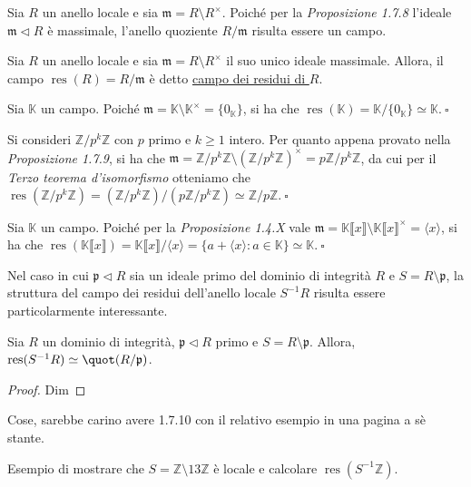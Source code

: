 \noindent Sia $R$ un anello locale e sia $\mathfrak{m}=R\setminus R^{\times}$. Poiché per la \emph{Proposizione 1.7.8} l'ideale $\mathfrak{m}\lhd R$ è massimale, l'anello quoziente $R/\mathfrak{m}$ risulta essere un campo.

\begin{defn}[]{}
Sia $R$ un anello locale e sia $\mathfrak{m}=R\setminus R^{\times}$ il suo unico ideale massimale. Allora, il campo $\operatorname{res}(R)=R/\mathfrak{m}$ è detto \underline{campo dei residui di $R$}.
\end{defn}

\begin{exm}Sia $\mathbb{K}$ un campo. Poiché $\mathfrak{m}=\mathbb{K}\setminus \mathbb{K}^{\times}=\{0_{\mathbb{K}}\}$, si ha che $\operatorname{res}(\mathbb{K})=\mathbb{K}/\{0_{\mathbb{K}}\}\simeq \mathbb{K}. \ \square$\end{exm}

\begin{exm}Si consideri $\mathbb{Z}/p^k\mathbb{Z}$ con $p$ primo e $k\geq 1$ intero. Per quanto appena provato nella \emph{Proposizione 1.7.9}, si ha che $\mathfrak{m}=\mathbb{Z}/p^k\mathbb{Z}\setminus (\mathbb{Z}/p^k\mathbb{Z})^{\times}=p\mathbb{Z}/p^k\mathbb{Z}$, da cui per il \emph{Terzo teorema d'isomorfismo} otteniamo che $\operatorname{res}(\mathbb{Z}/p^k\mathbb{Z})=(\mathbb{Z}/p^k\mathbb{Z})/(p\mathbb{Z}/p^k\mathbb{Z})\simeq \mathbb{Z}/p\mathbb{Z}. \ \square$\end{exm}

\begin{exm}Sia $\mathbb{K}$ un campo. Poiché per la \emph{Proposizione 1.4.X} vale $\mathfrak{m}=\mathbb{K}\llbracket x\rrbracket\setminus\mathbb{K}\llbracket x\rrbracket^{\times}=\langle x \rangle$, si ha che $\operatorname{res}(\mathbb{K}\llbracket x\rrbracket)=\mathbb{K}\llbracket x\rrbracket/\langle x\rangle = \{a+\langle x\rangle : a\in \mathbb{K}\}\simeq \mathbb{K}. \ \square$\end{exm}

\noindent Nel caso in cui $\mathfrak{p}\lhd R$ sia un ideale primo del dominio di integrità $R$ e $S=R\setminus \mathfrak{p}$, la struttura del campo dei residui dell'anello locale $S^{-1}R$ risulta essere particolarmente interessante.

\begin{prop}[1.7.10]{}
Sia $R$ un dominio di integrità, $\mathfrak{p}\lhd R$ primo e $S=R\setminus \mathfrak{p}$. Allora, $\operatorname{res}(S^{-1}R)\simeq \quot(R/\mathfrak{p})$.
\end{prop}
\vspace{-4mm}
\begin{proof}
Dim
\end{proof}

\noindent Cose, sarebbe carino avere 1.7.10 con il relativo esempio in una pagina a sè stante.

\begin{exm}Esempio di mostrare che $S=\mathbb{Z}\setminus 13\mathbb{Z}$ è locale e calcolare $\operatorname{res}(S^{-1}\mathbb{Z})$.\end{exm}

